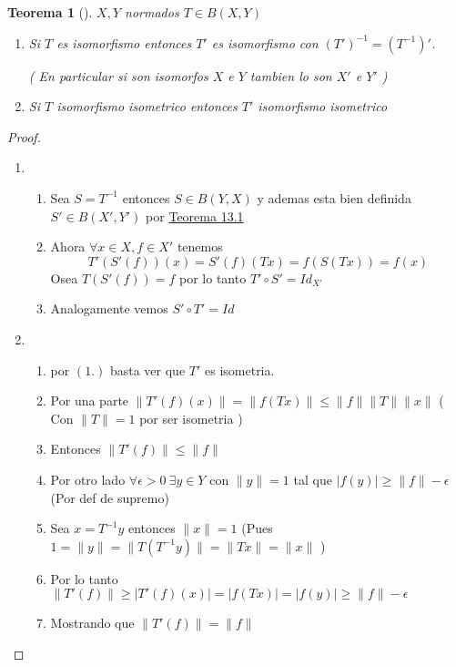 \documentclass[10pt]{extarticle}
\theoremstyle{break}
\newtheorem{theorem}{Teorema}[section]
\theoremstyle{definition}
\begin{document}
\begin{theorem}[]
	$ X,Y $ normados $ T\in B( X,Y )   $ 
	\begin{enumerate}
		\item Si $ T $ es isomorfismo entonces $ T' $ es isomorfismo con $ ( T')^{-1} =( T^{-1} )'  $. 

			( En particular si son isomorfos $ X $ e $ Y $ tambien lo son $ X' $ e $ Y' $ )  
		\item Si $ T $ isomorfismo isometrico entonces $ T' $ isomorfismo isometrico
	\end{enumerate}
\end{theorem}
\begin{proof}
	\begin{enumerate}
		\item 
		\begin{enumerate}
			\item Sea $S=T^{-1} $ entonces $ S\in B( Y,X )   $ y ademas esta bien definida $S'\in B( X',Y')$ por \hyperref[13.1]{Teorema 13.1} 
			\item Ahora $ \forall x\in X ,f\in X'  $ tenemos
			$$T'( S'(f))(x)=S'( f)( Tx)=f( S( Tx))=f( x)$$       
			Osea $T( S'( f))=f$ por lo tanto $T'\circ S'=Id_{X'}$  
			\item Analogamente vemos $S'\circ T'=Id$ 
		\end{enumerate}
	\item
		\begin{enumerate}\item por $(1.)$ basta ver que $T'$ es isometria. 
				\item Por una parte $\lVert T'(f)(x) \rVert =\lVert f(Tx) \rVert \leq \lVert f \rVert \lVert T \rVert \lVert x \rVert $ ( Con $\lVert T \rVert =1$ por ser isometria ) 
			\item Entonces $\lVert T'(f) \rVert \leq \lVert f \rVert $ 
			\item Por otro lado $\forall \epsilon>0\ \exists y\in Y$ con $\lVert y \rVert =1$ tal que $\lvert f(y) \rvert \geq \lVert f \rVert -\epsilon$ (Por def de supremo)
			\item Sea $x=T^{-1} y$ entonces $\lVert x \rVert =1$ (Pues $1= \lVert y \rVert =\lVert T(T^{-1} y) \rVert =\lVert T x \rVert =\lVert x \rVert $ ) 
			\item Por lo tanto $\lVert T'(f) \rVert \geq \lvert T'(f)(x) \rvert =\lvert f(Tx) \rvert= \lvert f(y) \rvert \geq \lVert f \rVert -\epsilon $ 
			\item Mostrando que $\lVert T'(f) \rVert =\lVert f \rVert $ 
		\end{enumerate}	
	\end{enumerate}
\end{proof}
\end{document}
